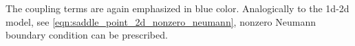 %
The coupling terms are again emphasized in blue color.
Analogically to the 1d-2d model, see \eqref{eqn:saddle_point_2d_nonzero_neumann}, nonzero
Neumann boundary condition can be prescribed.



% 
% 
% 
% 
% 
